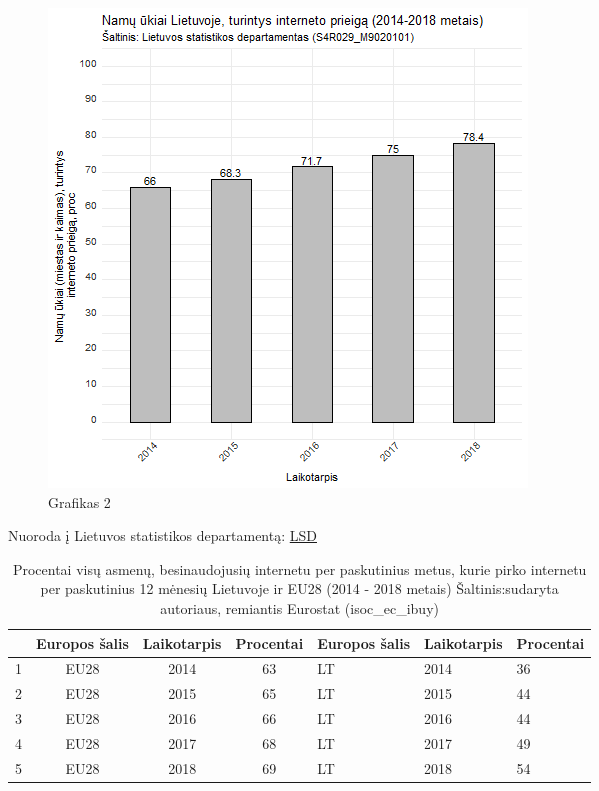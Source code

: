 \documentclass[12pt, titlepage]{article}
\begin{document}
\begin{figure}[H]
\center
\includegraphics[scale=0.8]{Grafikai/1.png} 
\caption{Grafikas 2}
\label{fig:2}
\end{figure}
\bigskip
Nuoroda į Lietuvos statistikos departamentą: \href{https://osp.stat.gov.lt/}{LSD}
\medskip
\begin{table}[H]
\centering
\caption{Procentai visų asmenų, besinaudojusių internetu per paskutinius metus, kurie pirko internetu per paskutinius 12 mėnesių Lietuvoje ir EU28 (2014 - 2018 metais)
Šaltinis:sudaryta autoriaus, remiantis Eurostat (isoc\_ec\_ibuy)}
\label{tab:3}
\begin{tabular}{|l|c|c|c|l|l|l|}
\hline
  & Europos šalis & Laikotarpis & \multicolumn{1}{r|}{Procentai} & Europos šalis & Laikotarpis & Procentai \\ \hline
1 & EU28          & 2014        & 63                             & LT            & 2014        & 36        \\ \hline
2 & EU28          & 2015        & 65                             & LT            & 2015        & 44        \\ \hline
3 & EU28          & 2016        & 66                             & LT            & 2016        & 44        \\ \hline
4 & EU28          & 2017        & 68                             & LT            & 2017        & 49        \\ \hline
5 & EU28          & 2018        & 69                             & LT            & 2018        & 54        \\
\hline
\end{tabular}
\end{table}
\end{document}
